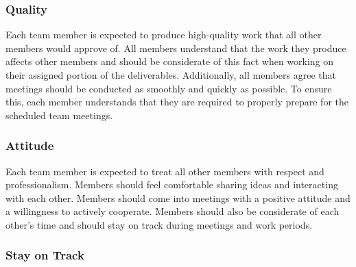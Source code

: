 \documentclass{article}
\begin{document}
\subsubsection*{Quality} 


Each team member is expected to produce high-quality work that all other members would approve of. All members understand that the work they produce affects other members and should be considerate of this fact when working on their assigned portion of the deliverables. Additionally, all members agree that meetings should be conducted as smoothly and quickly as possible. To ensure this, each member understands that they are required to properly prepare for the scheduled team meetings.

\subsubsection*{Attitude}


Each team member is expected to treat all other members with respect and professionalism. Members should feel comfortable sharing ideas and interacting with each other. Members should come into meetings with a positive attitude and a willingness to actively cooperate. Members should also be considerate of each other’s time and should stay on track during meetings and work periods.

\subsubsection*{Stay on Track}


\end{document}
